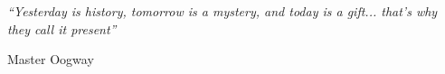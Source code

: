 \null\vfill
\textit{``Yesterday is history, tomorrow is a mystery, and today is a gift... that’s why they call it present''}

\begin{flushright}
Master Oogway
\end{flushright}

\vfill\vfill\vfill\vfill\vfill\vfill\null
\clearpage